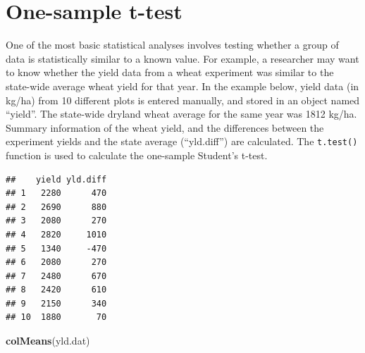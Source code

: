\documentclass[letterpaper,]{book}
\newenvironment{Shaded}{\begin{snugshade}}{\end{snugshade}}
\newcommand{\DataTypeTok}[1]{\textcolor[rgb]{0.13,0.29,0.53}{#1}}
\newcommand{\DecValTok}[1]{\textcolor[rgb]{0.00,0.00,0.81}{#1}}
\newcommand{\KeywordTok}[1]{\textcolor[rgb]{0.13,0.29,0.53}{\textbf{#1}}}
\newcommand{\NormalTok}[1]{#1}
\newcommand{\OperatorTok}[1]{\textcolor[rgb]{0.81,0.36,0.00}{\textbf{#1}}}
\newcommand{\StringTok}[1]{\textcolor[rgb]{0.31,0.60,0.02}{#1}}
\begin{document}
\hypertarget{one-sample-t-test}{%
\section{One-sample t-test}\label{one-sample-t-test}}

One of the most basic statistical analyses involves testing whether a group of data is statistically similar to a known value. For example, a researcher may want to know whether the yield data from a wheat experiment was similar to the state-wide average wheat yield for that year. In the example below, yield data (in kg/ha) from 10 different plots is entered manually, and stored in an object named ``yield''. The state-wide dryland wheat average for the same year was 1812 kg/ha. Summary information of the wheat yield, and the differences between the experiment yields and the state average (``yld.diff'') are calculated. The \texttt{t.test()} function is used to calculate the one-sample Student's t-test.

\begin{Shaded}
\end{Shaded}

\begin{verbatim}
##    yield yld.diff
## 1   2280      470
## 2   2690      880
## 3   2080      270
## 4   2820     1010
## 5   1340     -470
## 6   2080      270
## 7   2480      670
## 8   2420      610
## 9   2150      340
## 10  1880       70
\end{verbatim}

\begin{Shaded}
\begin{Highlighting}[]
\KeywordTok{colMeans}\NormalTok{(yld.dat)}
\end{Highlighting}
\end{Shaded}
\end{document}
